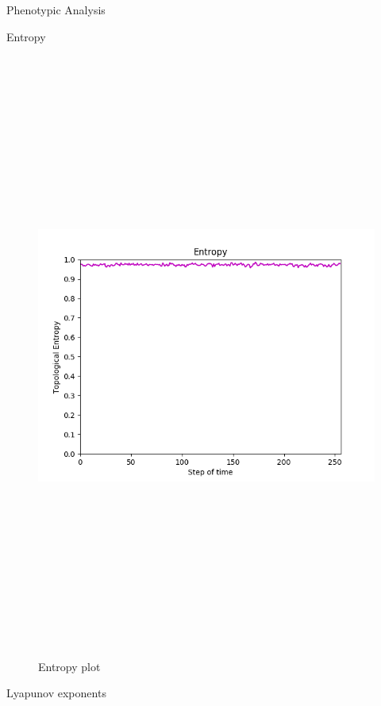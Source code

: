 \documentclass[12pt, letterpaper]{article}
\begin{document}
\begin{section}{Phenotypic Analysis}
\begin{subsection}{Entropy}
\begin{figure}[H]
			\includegraphics[max width=200mm, max height=200mm, keepaspectratio]{SimEntropy.png} 
		\caption{Entropy plot} 
		\end{figure} 
	\end{subsection}
	\begin{subsection}{Lyapunov exponents} 
		\begin{figure}[H] 
		\centering 

\end{figure}
\end{subsection}
\end{section}
\end{document}
